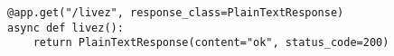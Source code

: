 \begin{verbatim}
@app.get("/livez", response_class=PlainTextResponse)
async def livez():
    return PlainTextResponse(content="ok", status_code=200)
\end{verbatim}